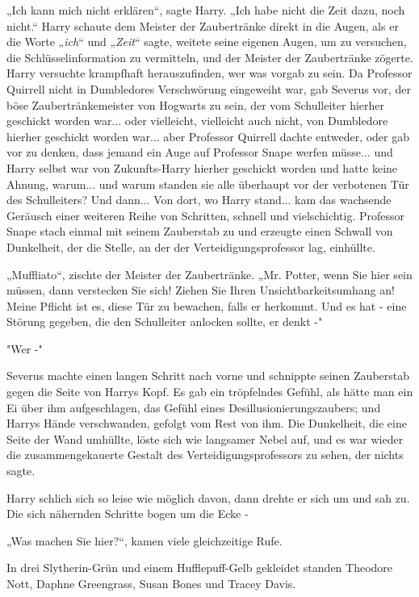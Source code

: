 {„Ich kann mich nicht erklären“, sagte Harry. „Ich habe nicht die Zeit dazu, noch nicht.“ Harry schaute dem Meister der Zaubertränke direkt in die Augen, als er die Worte „\emph{ich}“ und „\emph{Zeit}“ sagte, weitete seine eigenen Augen, um zu versuchen, die Schlüsselinformation zu vermitteln, und der Meister der Zaubertränke zögerte.\\ Harry versuchte krampfhaft herauszufinden, wer was vorgab zu sein. Da Professor Quirrell nicht in Dumbledores Verschwörung eingeweiht war, gab Severus vor, der böse Zaubertränkemeister von Hogwarts zu sein, der vom Schulleiter hierher geschickt worden war... oder vielleicht, vielleicht auch nicht, von Dumbledore hierher geschickt worden war... aber Professor Quirrell dachte entweder, oder gab vor zu denken, dass jemand ein Auge auf Professor Snape werfen müsse... und Harry selbst war von Zukunfts-Harry hierher geschickt worden und hatte keine Ahnung, warum... und warum standen sie alle überhaupt vor der verbotenen Tür des Schulleiters? Und dann... Von dort, wo Harry stand... kam das wachsende Geräusch einer weiteren Reihe von Schritten, schnell und vielschichtig. Professor Snape stach einmal mit seinem Zauberstab zu und erzeugte einen Schwall von Dunkelheit, der die Stelle, an der der Verteidigungsprofessor lag, einhüllte.

„Muffliato“, zischte der Meister der Zaubertränke. „Mr. Potter, wenn Sie hier sein müssen, dann verstecken Sie sich! Ziehen Sie Ihren Unsichtbarkeitsumhang an! Meine Pflicht ist es, diese Tür zu bewachen, falls er herkommt. Und es hat - eine Störung gegeben, die den Schulleiter anlocken sollte, er denkt -"

"Wer -"

Severus machte einen langen Schritt nach vorne und schnippte seinen Zauberstab gegen die Seite von Harrys Kopf. Es gab ein tröpfelndes Gefühl, als hätte man ein Ei über ihm aufgeschlagen, das Gefühl eines Desillusionierungszaubers; und Harrys Hände verschwanden, gefolgt vom Rest von ihm. Die Dunkelheit, die eine Seite der Wand umhüllte, löste sich wie langsamer Nebel auf, und es war wieder die zusammengekauerte Gestalt des Verteidigungsprofessors zu sehen, der nichts sagte.

Harry schlich sich so leise wie möglich davon, dann drehte er sich um und sah zu. Die sich nähernden Schritte bogen um die Ecke -

„Was machen Sie hier?“, kamen viele gleichzeitige Rufe.

In drei Slytherin-Grün und einem Hufflepuff-Gelb gekleidet standen Theodore Nott, Daphne Greengrass, Susan Bones und Tracey Davis.

}
